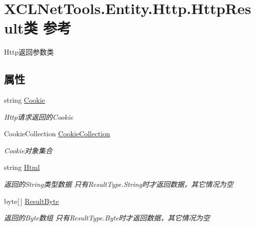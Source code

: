 \hypertarget{class_x_c_l_net_tools_1_1_entity_1_1_http_1_1_http_result}{}\section{X\+C\+L\+Net\+Tools.\+Entity.\+Http.\+Http\+Result类 参考}
\label{class_x_c_l_net_tools_1_1_entity_1_1_http_1_1_http_result}


Http返回参数类  


\subsection*{属性}
\begin{DoxyCompactItemize}
\item 
string \hyperlink{class_x_c_l_net_tools_1_1_entity_1_1_http_1_1_http_result_a08219bb78cf5eb91045b344c91e72fad}{Cookie}
\begin{DoxyCompactList}\small\item\em Http请求返回的\+Cookie \end{DoxyCompactList}\item 
Cookie\+Collection \hyperlink{class_x_c_l_net_tools_1_1_entity_1_1_http_1_1_http_result_a30f5eb22081db0c17f2924ac0ee89156}{Cookie\+Collection}
\begin{DoxyCompactList}\small\item\em Cookie对象集合 \end{DoxyCompactList}\item 
string \hyperlink{class_x_c_l_net_tools_1_1_entity_1_1_http_1_1_http_result_a9fc43bbbeb2f24faeeab16785cd7c402}{Html}
\begin{DoxyCompactList}\small\item\em 返回的\+String类型数据 只有\+Result\+Type.\+String时才返回数据，其它情况为空 \end{DoxyCompactList}\item 
byte\mbox{[}$\,$\mbox{]} \hyperlink{class_x_c_l_net_tools_1_1_entity_1_1_http_1_1_http_result_aced655e4fc880e3123a3eb5c899a0085}{Result\+Byte}
\begin{DoxyCompactList}\small\item\em 返回的\+Byte数组 只有\+Result\+Type.\+Byte时才返回数据，其它情况为空 \end{DoxyCompactList}\item 

\end{DoxyCompactItemize}
